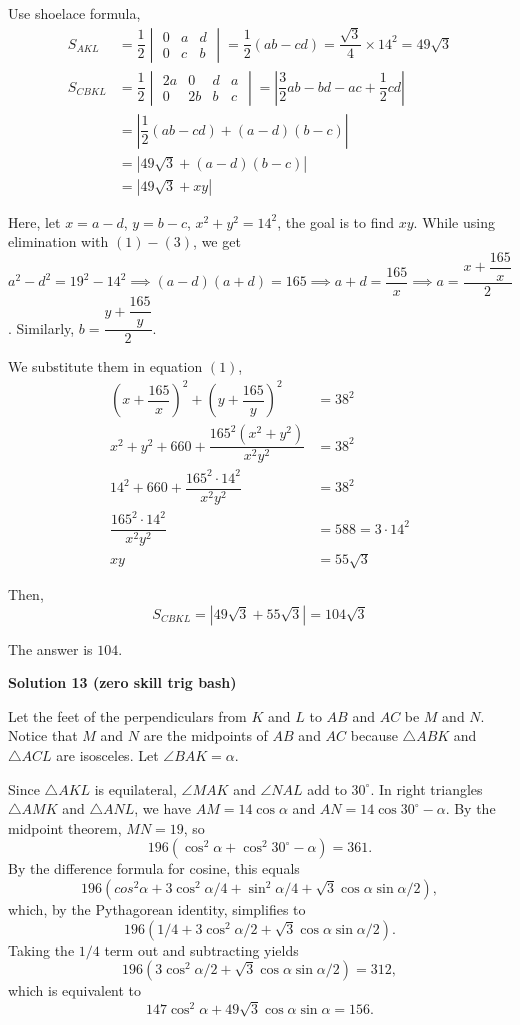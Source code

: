 \begin{enumerate}
 Use shoelace formula, \begin{align}S_{AKL} &= \dfrac{1}{2}\begin{vmatrix}0 & a & d\\0 & c & b\end{vmatrix} = \dfrac{1}{2}(ab - cd) = \dfrac{\sqrt{3}}{4} \times 14^2 = 49\sqrt{3}\\S_{CBKL} &= \dfrac{1}{2}\begin{vmatrix}2a & 0 & d & a\\0 & 2b & b & c\end{vmatrix} = \left|\dfrac{3}{2}ab - bd - ac + \dfrac{1}{2}cd\right|\\&= \left|\dfrac{1}{2}(ab - cd) + (a - d)(b - c)\right|\\&= |49\sqrt{3} + (a - d)(b - c)|\\&= |49\sqrt{3} + xy|\end{align}

 Here, let $x = a - d$, $y = b - c$, $x^2 + y^2 = 14^2$, the goal is to find $xy$. While using elimination with $(1) - (3)$, we get $a^2 - d^2 = 19^2 - 14^2 \implies (a - d)(a + d) = 165 \implies a + d = \dfrac{165}{x} \implies a = \dfrac{x + \dfrac{165}{x}}{2}$. Similarly, $b = \dfrac{y + \dfrac{165}{y}}{2}$.

 We substitute them in equation $(1)$,\begin{align}\left(x + \dfrac{165}{x}\right)^2 + \left(y + \dfrac{165}{y}\right)^2 &= 38^2\\x^2 + y^2 + 660 + \dfrac{165^2(x^2 + y^2)}{x^2y^2} &= 38^2\\14^2 + 660 + \dfrac{165^2 \cdot 14^2}{x^2y^2} &= 38^2\\\dfrac{165^2 \cdot 14^2}{x^2y^2} &= 588 = 3 \cdot 14^2\\xy &= 55\sqrt{3}\end{align}

 Then, 
 \[S_{CBKL} = |49\sqrt{3} + 55\sqrt{3}| = 104\sqrt{3}\]

 The answer is $\boxed{104}$.

 



\textbf{Solution 13 (zero skill trig bash)}

Let the feet of the perpendiculars from $K$ and $L$ to $AB$ and $AC$ be $M$ and $N$. Notice that $M$ and $N$ are the midpoints of $AB$ and $AC$ because $\triangle ABK$ and $\triangle ACL$ are isosceles. Let $\angle BAK = \alpha$. 

 
Since $\triangle AKL$ is equilateral, $\angle MAK$ and $\angle NAL$ add to $30^{\circ}$. In right triangles $\triangle AMK$ and $\triangle ANL$, we have $AM=14\cos{\alpha}$ and $AN=14\cos{30^{\circ}-\alpha}$. By the midpoint theorem, $MN=19$, so 
 \[196(\cos^2{\alpha}+\cos^2{30^{\circ}-\alpha})=361.\] By the difference formula for cosine, this equals 
 \[196(cos^2{\alpha}+3\cos^2{\alpha}/4+\sin^2{\alpha}/4+\sqrt{3}\cos{\alpha}\sin{\alpha}/2),\] which, by the Pythagorean identity, simplifies to 
 \[196(1/4+3\cos^2{\alpha}/2+ \sqrt{3}\cos{\alpha}\sin{\alpha}/2).\] Taking the $1/4$ term out and subtracting yields 
 \[196(3\cos^2{\alpha}/2+\sqrt{3}\cos{\alpha}\sin{\alpha}/2)=312,\] which is equivalent to 
 \[147\cos^2{\alpha}+49\sqrt{3}\cos{\alpha}\sin{\alpha}=156.\]


\end{enumerate}
